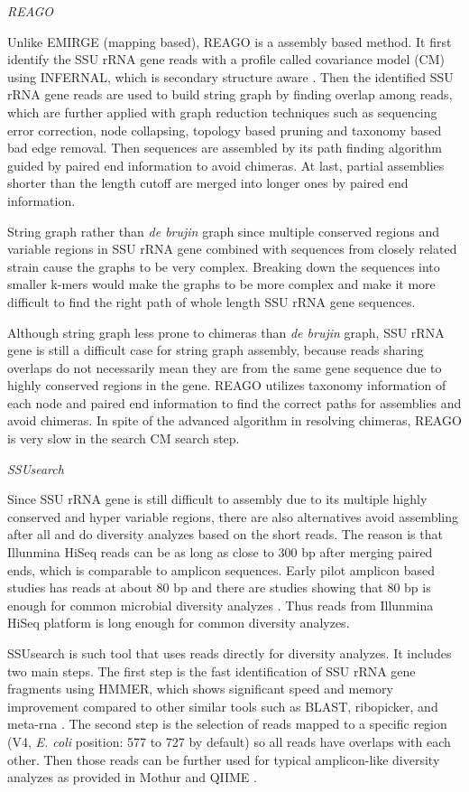 \documentclass[]{msu-thesis}
\begin{document}
\textit{REAGO}

Unlike EMIRGE (mapping based), REAGO is a assembly based method. It first identify the SSU rRNA gene reads with a profile called covariance model (CM) using INFERNAL, which is secondary structure aware \cite{nawrocki_infernal_2009}. Then the identified SSU rRNA gene reads are used to build string graph by finding overlap among reads, which are further applied with graph reduction techniques such as sequencing error correction, node collapsing, topology based pruning and taxonomy based bad edge removal. Then sequences are assembled by its path finding algorithm guided by paired end information to avoid chimeras. At last, partial assemblies shorter than the length cutoff are merged into longer ones by paired end information.

String graph rather than \textit{de brujin} graph since multiple conserved regions and variable regions in SSU rRNA gene combined with sequences from closely related strain cause the graphs to be very complex. Breaking down the sequences into smaller k-mers would make the graphs to be more complex and make it more difficult to find the right path of whole length SSU rRNA gene sequences.  

Although string graph less prone to chimeras than \textit{de brujin} graph, SSU rRNA gene is still a difficult case for string graph assembly, because reads sharing overlaps do not necessarily mean they are from the same gene sequence due to highly conserved regions in the gene. REAGO utilizes taxonomy information of each node and paired end information to find the correct paths for assemblies and avoid chimeras. In spite of the advanced algorithm in resolving chimeras, REAGO is very slow in the search CM search step.

\textit{SSUsearch}

Since SSU rRNA gene is still difficult to assembly due to its multiple highly conserved and hyper variable regions, there are also alternatives avoid assembling after all and do diversity analyzes based on the short reads. The reason is that Illunmina HiSeq reads can be as long as close to 300 bp after merging paired ends, which is comparable to amplicon sequences. Early pilot amplicon based studies has reads at about 80 bp and there are studies showing that 80 bp is enough for common microbial diversity analyzes \cite{sogin_microbial_2006}. Thus reads from Illunmina HiSeq platform is long enough for common diversity analyzes. 

SSUsearch is such tool that uses reads directly for diversity analyzes. It includes two main steps. The first step is the fast identification of SSU rRNA gene fragments using HMMER, which shows significant speed and memory improvement compared to other similar tools such as BLAST, ribopicker, and meta-rna \cite{altschul_gapped_1997,schmieder_identification_2012,huang_identification_2009}. The second step is the selection of reads mapped to a specific region (V4, \textit{E. coli} position: 577 to 727 by default) so all reads have overlaps with each other. Then those reads can be further used for typical amplicon-like diversity analyzes as provided in Mothur and QIIME \cite{schloss_introducing_2009,kuczynski_using_2012}.
\end{document}
